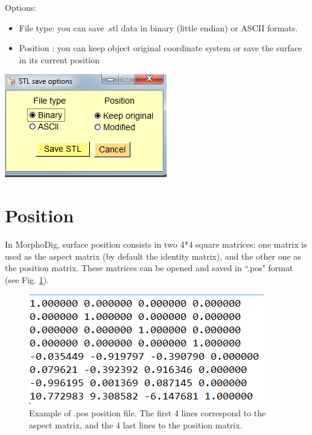 \begin{minipage}{0.5\textwidth}
Options:
\begin{itemize}
\item File type: you can save .stl data in binary (little endian) or
ASCII formats.

\item Position : you can keep object original coordinate system or save the surface in its current position
\end{itemize}

\end{minipage}    
\begin{minipage}{0.5\textwidth}\centering
  \includegraphics[scale=0.5]{images/File/Save_stl.png}
 \end{minipage} 







\section{Position}
In MorphoDig, surface position consists in two
4*4 square matrices: one matrix is used as the
aspect matrix (by default the identity matrix),
and the other one as the position matrix. These
matrices can be opened and saved in ``.pos"
format (see Fig. \ref{position_file}).


\begin{figure}
  \centering
  \includegraphics[scale=0.5]{images/File/Position_file.png}
 \caption{Example of .pos position file. The first 4 lines correspond
to the aspect matrix, and the 4 last lines to the position matrix.}
\label{position_file}
\end{figure}
 



